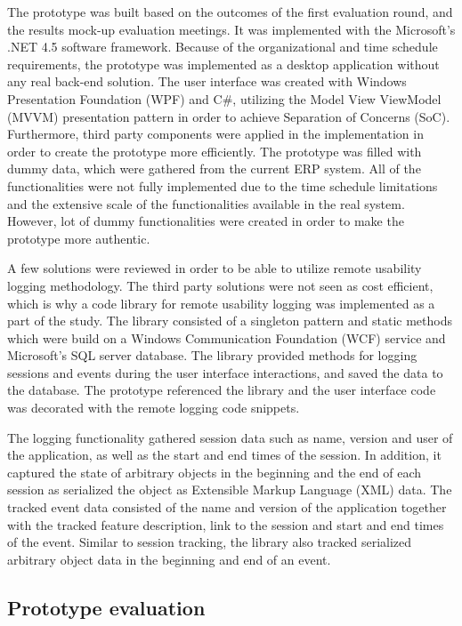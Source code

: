 \documentclass[12pt,a4paper,oneside,pdftex]{report}
\begin{document}
The prototype was built based on the outcomes of the first evaluation round, and the results mock-up evaluation meetings. It was implemented with the Microsoft's .NET 4.5 software framework. Because of the organizational and time schedule requirements, the prototype was implemented as a desktop application without any real back-end solution. The user interface was created with Windows Presentation Foundation (WPF) and C\#, utilizing the Model View ViewModel (MVVM) presentation pattern in order to achieve Separation of Concerns (SoC). \citep{RefWorks:37} Furthermore, third party components were applied in the implementation in order to create the prototype more efficiently. The prototype was filled with dummy data, which were gathered from the current ERP system. All of the functionalities were not fully implemented due to the time schedule limitations and the extensive scale of the functionalities available in the real system. However, lot of dummy functionalities were created in order to make the prototype more authentic.

A few solutions were reviewed in order to be able to utilize remote usability logging methodology. The third party solutions were not seen as cost efficient, which is why a code library for remote usability logging was implemented as a part of the study. The library consisted of a singleton pattern and static methods which were build on a Windows Communication Foundation (WCF) service and Microsoft's SQL server database. The library provided methods for logging sessions and events during the user interface interactions, and saved the data to the database. The prototype referenced the library and the user interface code was  decorated with the remote logging code snippets.

The logging functionality gathered session data such as name, version and user of the application, as well as the start and end times of the session. In addition, it captured the state of arbitrary objects in the beginning and the end of each session as serialized the object as Extensible Markup Language (XML) data. The tracked event data consisted of the name and version of the application together with the tracked feature description, link to the session and start and end times of the event. Similar to session tracking, the library also tracked serialized arbitrary object data in the beginning and end of an event.

	  
\subsection{Prototype evaluation}
\end{document}

